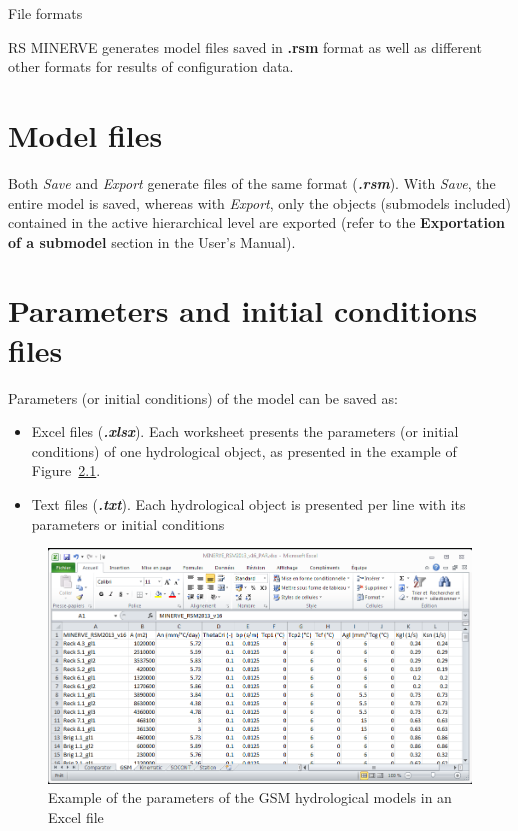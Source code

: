 \documentclass[
  letterpaper,
  DIV=11,
  numbers=noendperiod]{scrreprt}
\begin{document}
File formats

RS MINERVE generates model files saved in \textbf{.rsm} format as well
as different other formats for results of configuration data.

\hypertarget{model-files}{%
\chapter{Model files}\label{model-files}}

Both \emph{Save} and \emph{Export} generate files of the same format
(\textbf{\emph{.rsm}}). With \emph{Save}, the entire model is saved,
whereas with \emph{Export}, only the objects (submodels included)
contained in the active hierarchical level are exported (refer to the
\textbf{Exportation of a submodel} section in the User's Manual).

\hypertarget{parameters-and-initial-conditions-files}{%
\chapter{Parameters and initial conditions
files}\label{parameters-and-initial-conditions-files}}

Parameters (or initial conditions) of the model can be saved as:

\begin{itemize}
\item
  Excel files (\textbf{\emph{.xlsx}}). Each worksheet presents the
  parameters (or initial conditions) of one hydrological object, as
  presented in the example of
  Figure~\ref{fig-example_gsm_param_excel_file}.
\item
  Text files (\textbf{\emph{.txt}}). Each hydrological object is
  presented per line with its parameters or initial conditions
\end{itemize}

\begin{figure}

{\centering \includegraphics{./figures/fig-example_gsm_param_excel_file.png}

}

\caption{\label{fig-example_gsm_param_excel_file}Example of the
parameters of the GSM hydrological models in an Excel file}

\end{figure}
\end{document}
